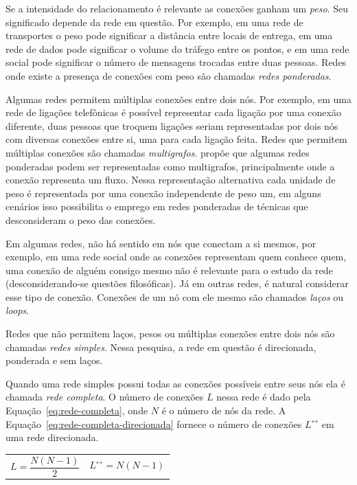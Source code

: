 \documentclass[12pt,a4paper]{article}
\theoremstyle{hypo}
\newcommand{\linkboth}[1]{#1^\leftrightarrow} %
\begin{document}
Se a intensidade do relacionamento é relevante as conexões ganham um \textit{peso}. Seu significado depende da rede em questão. Por exemplo, em uma rede de transportes o peso pode significar a distância entre locais de entrega, em uma rede de dados pode significar o volume do tráfego entre os pontos, e em uma rede social pode significar o número de mensagens trocadas entre duas pessoas. Redes onde existe a presença de conexões com peso são chamadas \textit{redes ponderadas}.

Algumas redes permitem múltiplas conexões entre dois nós. Por exemplo, em uma rede de ligações telefônicas é possível representar cada ligação por uma conexão diferente, duas pessoas que troquem ligações seriam representadas por dois nós com diversas conexões entre si, uma para cada ligação feita. Redes que permitem múltiplas conexões são chamadas \textit{multigrafos}.  propõe que algumas redes ponderadas podem ser representadas como multigrafos, principalmente onde a conexão representa um fluxo. Nessa representação alternativa cada unidade de peso é representada por uma conexão independente de peso um, em alguns cenários isso possibilita o emprego em redes ponderadas de técnicas que desconsideram o peso das conexões.

Em algumas redes, não há sentido em nós que conectam a si mesmos, por exemplo, em uma rede social onde as conexões representam quem conhece quem, uma conexão de alguém consigo mesmo não é relevante para o estudo da rede (desconsiderando-se questões filosóficas). Já em outras redes, é natural considerar esse tipo de conexão. Conexões de um nó com ele mesmo são chamados \textit{laços} ou \textit{loops}.

Redes que não permitem laços, pesos ou múltiplas conexões entre dois nós são chamadas \textit{redes simples}. Nessa pesquisa, a rede em questão é direcionada, ponderada e sem laços.

Quando uma rede simples possui todas as conexões possíveis entre seus nós ela é chamada \textit{rede completa}. O número de conexões $L$ nessa rede é dado pela Equação~\ref{eq:rede-completa}, onde $N$ é o número de nós da rede. A Equação~\ref{eq:rede-completa-direcionada} fornece o número de conexões $\linkboth{L}$ em uma rede direcionada.

\noindent
\begin{tabularx}{\linewidth}{@{}XX@{}}
    \begin{equation} \label{eq:rede-completa}
       L = \frac{N(N - 1)}{2}
    \end{equation} &
    \begin{equation} \label{eq:rede-completa-direcionada}
        \linkboth{L} = N(N - 1)
    \end{equation}
\end{tabularx}
\end{document}
